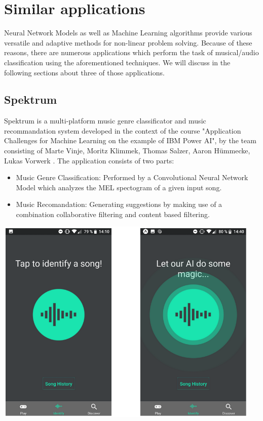 \chapter{Similar applications}

Neural Network Models as well as Machine Learning algorithms provide various versatile and adaptive methods for non-linear problem solving. Because of these reasons, there are numerous applications which perform the task of musical/audio classification using the aforementioned techniques. We will discuss in the following sections about three of those applications.

\section{Spektrum}

Spektrum is a multi-platform music genre classificator and music recommandation system developed in the context of the course "Application Challenges for
Machine Learning on the example of IBM Power AI", by the team consisting of Marte Vinje, Moritz Klimmek, Thomas Salzer, Aaron Hümmecke, Lukas Vorwerk \cite{spektrum} . The application consists of two parts:
\begin{itemize}
	\item Music Genre Classification: Performed by a Convolutional Neural Network Model which analyzes the MEL spectogram of a given input song.
	\item Music Recomandation: Generating suggestions by making use of a combination collaborative filtering
		and content based filtering.
\end{itemize}

\begin{center}
	\centering
	\includegraphics[width = 5.0in]{images/spektrum.png}
	\centerline{}
\label{spektrum}
\end{center}


